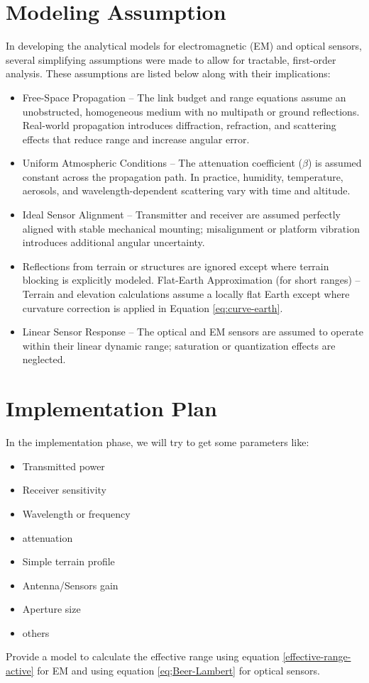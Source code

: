 \documentclass{article}
\begin{document}
\section{Modeling Assumption}
In developing the analytical models for electromagnetic (EM) and optical sensors, several simplifying assumptions were made to allow for tractable, first-order analysis. These assumptions are listed below along with their implications:
\begin{itemize}
    \item Free-Space Propagation – The link budget and range equations assume an unobstructed, homogeneous medium with no multipath or ground reflections. Real-world propagation introduces diffraction, refraction, and scattering effects that reduce range and increase angular error.
    \item Uniform Atmospheric Conditions – The attenuation coefficient ($\beta$) is assumed constant across the propagation path. In practice, humidity, temperature, aerosols, and wavelength-dependent scattering vary with time and altitude.
    \item Ideal Sensor Alignment – Transmitter and receiver are assumed perfectly aligned with stable mechanical mounting; misalignment or platform vibration introduces additional angular uncertainty.
    \item Reflections from terrain or structures are ignored except where terrain blocking is explicitly modeled.
    Flat-Earth Approximation (for short ranges) – Terrain and elevation calculations assume a locally flat Earth except where curvature correction is applied in Equation \ref{eq:curve-earth}.
    \item Linear Sensor Response – The optical and EM sensors are assumed to operate within their linear dynamic range; saturation or quantization effects are neglected.
\end{itemize}

\section{Implementation Plan}
In the implementation phase, we will try to get some parameters like:
\begin{itemize}
    \item Transmitted power
    \item Receiver sensitivity
    \item Wavelength or frequency
    \item attenuation
    \item Simple terrain profile
    \item Antenna/Sensors gain
    \item Aperture size
    \item others
\end{itemize}
Provide a model to calculate the effective range using equation \ref{effective-range-active} for EM and using equation \ref{eq;Beer-Lambert} for optical sensors.
\end{document}
